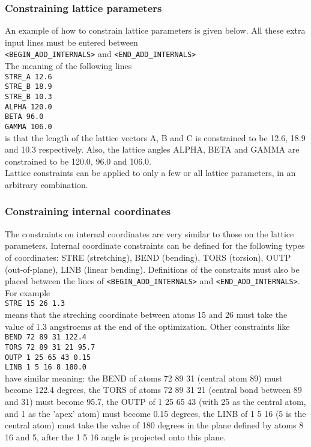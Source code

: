 \documentclass[prl,aps,preprint,superbib,12pt]{revtex4}
\begin{document}
\subsubsection{Constraining lattice parameters}
An example of how to constrain lattice parameters is given
below. All these extra input lines must be entered between
\\
{\tt <BEGIN\_ADD\_INTERNALS>} and {\tt <END\_ADD\_INTERNALS>}
\\
The meaning of the following lines
\\
{\tt STRE\_A 12.6}
\\
{\tt STRE\_B 18.9}
\\
{\tt STRE\_B 10.3}
\\
{\tt ALPHA 120.0}
\\
{\tt BETA  96.0}
\\
{\tt GAMMA 106.0}
\\
is that the length of the lattice vectors A, B and C is constrained to
be 12.6, 18.9 and 10.3 respectively. Also, the lattice angles ALPHA, BETA
and GAMMA are constrained to be 120.0, 96.0 and 106.0.
\\
Lattice constraints can be applied to only a few or all lattice parameters,
in an arbitrary combination.

\subsubsection{Constraining internal coordinates}
The constraints on internal coordinates are very similar to those
on the lattice parameters.
Internal coordinate constraints can be defined for the following types of coordinates:
STRE (stretching), BEND (bending), TORS (torsion), OUTP (out-of-plane), LINB 
(linear bending).
Definitions of the constraits must also be placed between the lines of
{\tt <BEGIN\_ADD\_INTERNALS>} and {\tt <END\_ADD\_INTERNALS>}.
\\
For example
\\
{\tt STRE 15 26 1.3} 
\\
means that the streching coordinate between atoms 15 and 26 must take 
the value of 1.3 angstroems at the end of the optimization.
Other constraints like
\\
{\tt BEND 72 89 31   122.4}
\\
{\tt TORS 72 89 31 21  95.7}
\\
{\tt OUTP  1 25 65 43  0.15}
\\
{\tt LINB  1 5 16  8  180.0}
\\
have similar meaning: the BEND of atoms 72 89 31 (central atom 89) 
must become 122.4 degrees,
the TORS of atoms 72 89 31 21 (central bond between 89 and 31) must 
become 95.7, the OUTP of 1 25 65 43 (with 25 as the central atom, 
and 1 as the 'apex' atom) must become 0.15 degrees,
the LINB of 1 5 16 (5 is the central atom) must take the value of 180 degrees
in the plane defined by atoms 8 16 and 5, after the 1 5 16 angle is projected 
onto this plane.
\end{document}
